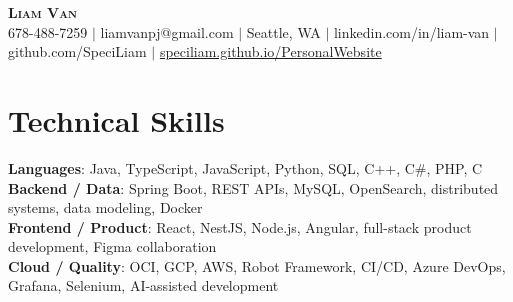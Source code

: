 \documentclass[letterpaper,11pt]{article}
\begin{document}

%
\begin{center}
    \textbf{\Huge \scshape Liam Van} \\ \vspace{1pt}
    \small 678-488-7259 $|$ \small {liamvanpj@gmail.com} $|$ Seattle, WA
 {{$|$ linkedin.com/in/liam-van} {$|$ github.com/SpeciLiam} {$|$ \href{https://speciliam.github.io/PersonalWebsite}{speciliam.github.io/PersonalWebsite}}}

\end{center}

\section{Technical Skills}
 \begin{itemize}[leftmargin=0.15in, label={}]
    \small{\item{
     \textbf{Languages}{: Java, TypeScript, JavaScript, Python, SQL, C++, C\#, PHP, C} \\
     \textbf{Backend / Data}{: Spring Boot, REST APIs, MySQL, OpenSearch, distributed systems, data modeling, Docker} \\
     \textbf{Frontend / Product}{: React, NestJS, Node.js, Angular, full-stack product development, Figma collaboration} \\
     \textbf{Cloud / Quality}{: OCI, GCP, AWS, Robot Framework, CI/CD, Azure DevOps, Grafana, Selenium, AI-assisted development} \\
    }}
 \end{itemize}
%
\end{document}
